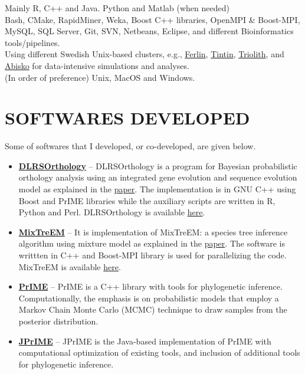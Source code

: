 \documentclass[margin, 10pt]{res} %
\begin{document}
\begin{resume}
{\bf \color{Brown}{Languages:}} 
Mainly R, C++ and Java. Python and Matlab (when needed)\\
{\bf \color{Brown}{Misc Tools:}} Bash, CMake, RapidMiner, Weka, Boost C++ libraries, OpenMPI \& Boost-MPI, MySQL, SQL Server, Git, SVN, Netbeans, Eclipse, and different Bioinformatics tools/pipelines. \\
{\bf \color{Brown}{HPC Clusters:}} Using different Swedish Unix-based clusters, e.g., \href{https://www.pdc.kth.se/resources/computers/historical-computers/ferlin}{Ferlin}, \href{http://www.uppmax.uu.se/}{Tintin}, \href{https://www.nsc.liu.se/systems/triolith/}{Triolith}, and \href{http://www.hpc2n.umu.se/resources/abisko}{Abisko} for data-intensive simulations and analyses. \\
{\bf \color{Brown}{Operating Systems:}} (In order of preference) Unix, MacOS and Windows.


\section{SOFTWARES DEVELOPED} 
Some of softwares that I developed, or co-developed, are given below.
\begin{itemize}
\item \textbf{\href{https://bitbucket.org/ikramu/dlrsorthology/}{DLRSOrthology}} -- DLRSOrthology is a program for Bayesian probabilistic orthology analysis using an integrated gene evolution and sequence evolution model as explained in the \href{https://doi.org/10.1093/sysbio/syv044}{paper}. The implementation is in GNU C++ using Boost and PrIME libraries while the auxiliary scripts are written in R, Python and Perl. DLRSOrthology is available \href{https://bitbucket.org/ikramu/dlrsorthology}{here}.
\item \textbf{\href{https://bitbucket.org/ikramu/mixtreem}{MixTreEM}} -- It is implementation of MixTreEM: a species tree inference algorithm using mixture model as explained in the \href{https://doi.org/10.1093/molbev/msv115}{paper}. The software is writtten in C++ and Boost-MPI library is used for parallelizing the code. MixTreEM is available \href{https://bitbucket.org/ikramu/mixtreem}{here}.
\item \textbf{\href{http://prime.scilifelab.se/}{PrIME}} -- PrIME is a C++ library with tools for phylogenetic inference. Computationally, the emphasis is on probabilistic models that employ a Markov Chain Monte Carlo (MCMC) technique to draw samples from the posterior distribution.
\item \textbf{\href{https://code.google.com/p/jprime/}{JPrIME}} -- JPrIME is the Java-based implementation of PrIME with computational optimization of existing tools, and inclusion of additional tools for phylogenetic inference.
\end{itemize}


\end{resume}
\end{document}
